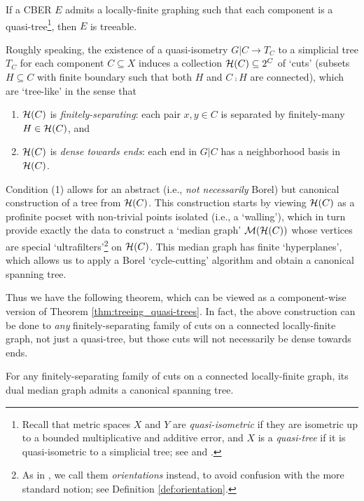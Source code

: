 \documentclass[reqno]{amsart}
\begin{document}
    \begin{mainTheorem}\label{thm:treeing_quasi-trees}
        If a CBER $E$ admits a locally-finite graphing such that each component is a quasi-tree\footnote{Recall that metric spaces $X$ and $Y$ are \textit{quasi-isometric} if they are isometric up to a bounded multiplicative and additive error, and $X$ is a \textit{quasi-tree} if it is quasi-isometric to a simplicial tree; see \cite{Gro93} and \cite{DK18}.}, then $E$ is treeable.
    \end{mainTheorem}

    Roughly speaking, the existence of a quasi-isometry $G|C\to T_C$ to a simplicial tree $T_C$ for each component $C\subseteq X$ induces a collection $\mathcal{H}(C)\subseteq2^C$ of `cuts' (subsets $H\subseteq C$ with finite boundary such that both $H$ and $C\comp H$ are connected), which are `tree-like' in the sense that
    \begin{enumerate}
        \item[1.] $\mathcal{H}(C)$ is \textit{finitely-separating}: each pair $x,y\in C$ is separated by finitely-many $H\in\mathcal{H}(C)$, and
        \item[2.] $\mathcal{H}(C)$ is \textit{dense towards ends}: each end in $G|C$ has a neighborhood basis in $\mathcal{H}(C)$.
    \end{enumerate}
    Condition (1) allows for an abstract (i.e., \textit{not necessarily} Borel) but canonical construction of a tree from $\mathcal{H}(C)$. This construction starts by viewing $\mathcal{H}(C)$ as a profinite pocset with non-trivial points isolated (i.e., a `walling'), which in turn provide exactly the data to construct a `median graph' $\mathcal{M}(\mathcal{H}(C))$ whose vertices are special `ultrafilters'\footnote{As in \cite{CPTT23}, we call them \textit{orientations} instead, to avoid confusion with the more standard notion; see Definition \ref{def:orientation}.} on $\mathcal{H}(C)$. This median graph has finite `hyperplanes', which allows us to apply a Borel `cycle-cutting' algorithm and obtain a canonical spanning tree.

    Thus we have the following theorem, which can be viewed as a component-wise version of Theorem \ref{thm:treeing_quasi-trees}. In fact, the above construction can be done to \textit{any} finitely-separating family of cuts on a connected locally-finite graph, not just a quasi-tree, but those cuts will not necessarily be dense towards ends.

    \begin{mainTheorem}\label{thm:component-wise_construction}
        For any finitely-separating family of cuts on a connected locally-finite graph, its dual median graph admits a canonical spanning tree.
    \end{mainTheorem}
\end{document}
